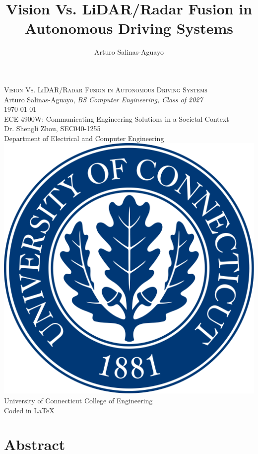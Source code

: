 \documentclass[12pt]{article}
\title{\bfseries\LARGE Vision Vs. LiDAR/Radar Fusion in Autonomous Driving Systems}
\author{Arturo Salinas-Aguayo}
\begin{document}
\begin{titlepage}
    \centering
    \vspace*{3cm}
    {\Large \textsc{Vision Vs. LiDAR/Radar Fusion in Autonomous Driving
		Systems}}\\
		Arturo Salinas-Aguayo, \textit{BS Computer Engineering, Class of 2027}\\
		\today\\
    \vspace{1.5cm}
    ECE 4900W: Communicating Engineering Solutions in a Societal Context\\
    Dr. Shengli Zhou, SEC040-1255\\
    Department of Electrical and Computer Engineering\\
    \vfill
    \includegraphics[scale=0.1]{uconnlogo}\\[1em]
    University of Connecticut College of Engineering\\
    \small\tiny{Coded in \LaTeX} \\
    \vspace{1cm}
\end{titlepage}

\tableofcontents
\newpage

\section*{Abstract}
\end{document}
